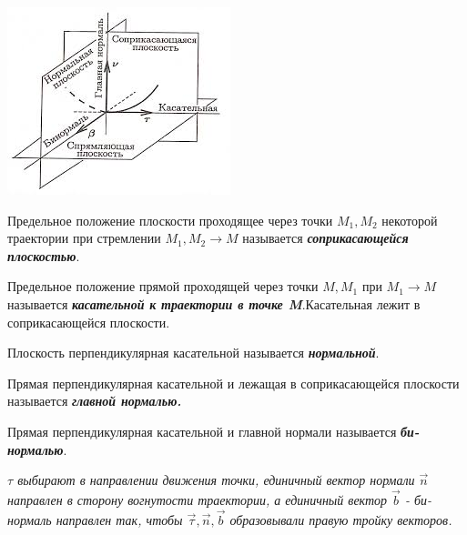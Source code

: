 \documentclass[../main.tex]{subfiles}
\begin{document}
\begin{enumerate}
\begin{enumerate}
\begin{center}
                        \includegraphics[]{img/images.jpeg}
                    \end{center}
                    \vspace{5px}

                     Предельное положение плоскости проходящее через точки $M_1,M_2$ некоторой траектории при стремлении $M_1,M_2 \to M$ называется \textbf{\textit{соприкасающейся плоскостью}}.

                    \vspace{5px}

                     Предельное положение прямой проходящей через точки $M,M_1$ при $M_1 \to M$ называется \textbf{\textit{касательной к траектории в точке M}}.Касательная лежит в соприкасающейся плоскости.

                    \vspace{5px}

                     Плоскость перпендикулярная касательной называется \textbf{\textit{нормальной}}.

                    \vspace{5px}

                     Прямая перпендикулярная касательной и лежащая в соприкасающейся плоскости называется \textbf{\textit{главной нормалью.}}

                    \vspace{5px}

                     Прямая перпендикулярная касательной и главной нормали называется \textbf{\textit{би-нормалью}}.

                    \vspace{5px}

                    \textit{$\tau$ выбирают в направлении движения точки, единичный вектор нормали $\vec n$ направлен в сторону вогнутости траектории, а единичный вектор $\vec b$ - би-нормаль направлен так, чтобы $\vec \tau, \vec n, \vec b$ образовывали правую тройку векторов.}


\end{enumerate}
\end{enumerate}
\end{document}
